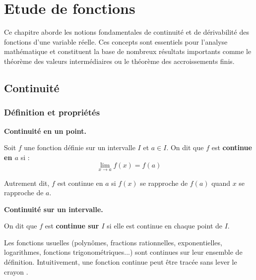 \documentclass[../PolyS2.tex]{subfiles}
\begin{document}
\setcounter{chapter}{0}
\chapter{Etude de fonctions}

Ce chapitre aborde les notions fondamentales de continuité et de dérivabilité des fonctions d'une variable réelle. Ces concepts sont essentiels pour l'analyse mathématique et constituent la base de nombreux résultats importants comme le théorème des valeurs intermédiaires ou le théorème des accroissements finis.

\section{Continuité}

\subsection{Définition et propriétés}

\begin{Def}
\textbf{Continuité en un point.}

Soit $f$ une fonction définie sur un intervalle $I$ et $a \in I$. On dit que $f$ est \textbf{continue en $a$} si :
$$\lim_{x \to a} f(x) = f(a)$$

Autrement dit, $f$ est continue en $a$ si $f(x)$ se \og rapproche \fg{} de $f(a)$ quand $x$ se \og rapproche \fg{} de $a$.
\end{Def}

\begin{Def}
\textbf{Continuité sur un intervalle.}

On dit que $f$ est \textbf{continue sur $I$} si elle est continue en chaque point de $I$.
\end{Def}

\begin{Rmq}
Les fonctions usuelles (polynômes, fractions rationnelles, exponentielles, logarithmes, fonctions trigonométriques...) sont continues sur leur ensemble de définition. Intuitivement, une fonction continue peut être tracée \og sans lever le crayon \fg{}.
\end{Rmq}
\end{document}
